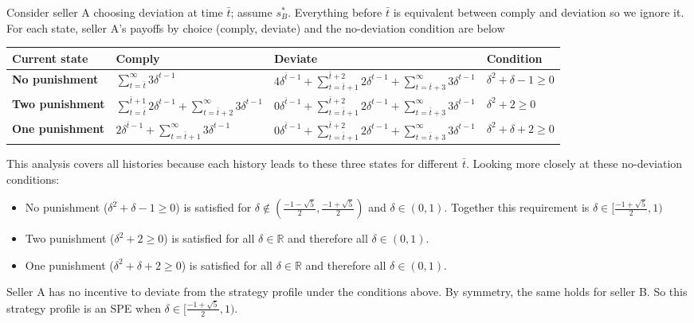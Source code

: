 \documentclass[11pt]{exam}
\begin{document}
\begin{questions}
\begin{parts}
        Consider seller A choosing deviation at time $\bar t$; assume $s^*_B$. Everything before $\bar t$ is equivalent between comply and deviation so we ignore it. For each state, seller A's payoffs by choice (comply, deviate) and the no-deviation condition are below
        \begin{table}[h!]
        \centering
        \begin{tabular}{l|lll}
            \textbf{Current state} & \textbf{Comply} & \textbf{Deviate} & \textbf{Condition} \\
            \hline
            \textbf{No punishment} 
                & $\sum_{t=\bar t}^\infty 3\delta^{t-1}$ 
                & $4\delta^{\bar t-1} + \sum_{t=\bar t+1}^{\bar t+2} 2\delta^{t-1} + \sum_{t=\bar t+3}^\infty 3\delta^{t-1}$
                & $\delta^2 + \delta - 1 \geq 0$ \\
            \textbf{Two punishment} 
                & $\sum_{t=\bar t}^{\bar t+1} 2\delta^{t-1} + \sum_{t=\bar t+2}^\infty 3\delta^{t-1}$  
                & $0\delta^{\bar t-1} + \sum_{t=\bar t+1}^{\bar t+2} 2\delta^{t-1} + \sum_{t=\bar t+3}^\infty 3\delta^{t-1}$ 
                & $\delta^2 +2 \geq 0$\\
            \textbf{One punishment} 
                & $2\delta^{\bar t-1} + \sum_{t=\bar t+1}^\infty 3\delta^{t-1}$  
                & $0\delta^{\bar t-1} + \sum_{t=\bar t+1}^{\bar t+2} 2\delta^{t-1} + \sum_{t=\bar t+3}^\infty 3\delta^{t-1}$
                & $\delta^2 + \delta + 2 \geq 0$
        \end{tabular}
        \end{table}
        This analysis covers all histories because each history leads to these three states for different $\bar t$. Looking more closely at these no-deviation conditions:
        \begin{itemize}
            \item No punishment ($\delta^2 + \delta - 1 \geq 0$) is satisfied for $\delta \notin (\tfrac{-1-\sqrt5}{2}, \tfrac{-1+\sqrt5}{2} )$ and $\delta \in (0,1)$. Together this requirement is $\delta \in [\tfrac{-1+\sqrt5}{2}, 1)$
            \item Two punishment ($\delta^2 +2 \geq 0$) is satisfied for all $\delta \in \mathbb R$ and therefore all $\delta \in(0,1)$.
            \item One punishment ($\delta^2 + \delta + 2 \geq 0$) is satisfied for all $\delta\in\mathbb R$ and therefore all $\delta \in(0,1)$.
        \end{itemize}
        Seller A has no incentive to deviate from the strategy profile under the conditions above. By symmetry, the same holds for seller B. So this strategy profile is an SPE when $\delta \in [\tfrac{-1+\sqrt5}{2}, 1)$.


\end{parts}
\end{questions}
\end{document}
